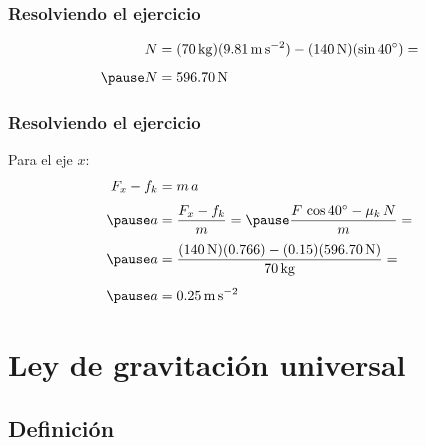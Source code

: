 \documentclass[14pt]{beamer}
\begin{document}
\begin{frame}
\frametitle{Resolviendo el ejercicio}
\pause
\begin{eqnarray*}
\begin{aligned}
N &= (\SI{70}{\kilo\gram})(\SI{9.81}{\meter\per\square\second}) - (\SI{140}{\newton})(\sin \ang{40}) = \\[0.5em] \pause
N &= \SI{596.70}{\newton}
\end{aligned}
\end{eqnarray*}
\end{frame}
\begin{frame}
\frametitle{Resolviendo el ejercicio}
Para el eje $x$:
\pause
\begin{eqnarray*}
\begin{aligned}
F_{x} - f_{k} &= m \, a \\[0.3em] \pause
a &= \dfrac{F_{x} - f_{k}}{m} = \pause \dfrac{F \, \cos \ang{40} - \mu_{k} \, N}{m} = \\[0.3em] \pause
a &= \dfrac{(\SI{140}{\newton})(0.766) - (0.15)(\SI{596.70}{\newton})}{\SI{70}{\kilo\gram}} = \\[0.5em]\pause
a &= \SI{0.25}{\meter\per\square\second}
\end{aligned}
\end{eqnarray*}
\end{frame}

\section{Ley de gravitación universal}
\subsection{Definición}
\end{document}
